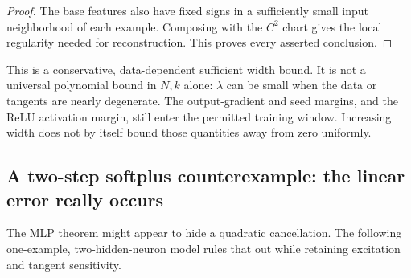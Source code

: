 \documentclass[12pt,a4paper]{article}
\theoremstyle{readable}
\theoremstyle{definition}\newtheorem{example}[theorem]{Example}
\begin{document}
\begin{proof}
The base features also have fixed signs in a sufficiently small input neighborhood of each example. Composing with the \(C^2\) chart gives the local regularity needed for reconstruction. This proves every asserted conclusion.
\end{proof}
This is a conservative, data-dependent sufficient width bound. It is not a universal polynomial bound in \(N,k\) alone: \(\lambda\) can be small when the data or tangents are nearly degenerate. The output-gradient and seed margins, and the ReLU activation margin, still enter the permitted training window. Increasing width does not by itself bound those quantities away from zero uniformly.

\subsection{A two-step softplus counterexample: the linear error really occurs}
The MLP theorem might appear to hide a quadratic cancellation. The following one-example, two-hidden-neuron model rules that out while retaining excitation and tangent sensitivity.
\end{document}
